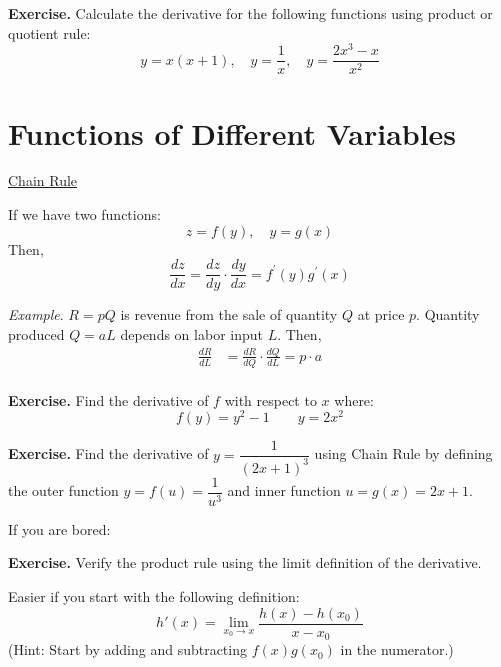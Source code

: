 \documentclass{./../../latex/handout}
\begin{document}
\newpage
\textbf{Exercise.} Calculate the derivative for the following functions using product or quotient rule:
\[ y = x(x+1), \quad y=\frac{1}{x}, \quad y = \frac{2x^3-x}{x^2}\]

\newpage 
\section*{Functions of Different Variables}

\underline{Chain Rule} 

If we have two functions:
\[ z=f(y), \quad y=g(x) \]
Then, 
\[\frac{d z}{d x}=\frac{d z}{d y} \cdot \frac{d y}{d x}=f^{\prime}(y) g^{\prime}(x) \]

\textit{Example}. $R = p Q $ is revenue from the sale of quantity $Q$ at price $p$. Quantity produced $Q= a L$ depends on labor input $L$. Then,
\[
\begin{aligned}
\frac{d R}{d L} &=\frac{d R}{d Q} \cdot \frac{d Q}{d L} = p \cdot a\\
\end{aligned}
\]


\textbf{Exercise.} Find the derivative of $f$ with respect to $x$ where:
\[ f(y) = y^2-1 \quad \quad y = 2x^2  \]

\vspace{3cm}
\textbf{Exercise.} Find the derivative of $y = \dfrac{1}{(2x+1)^3}$ using Chain Rule by defining the outer function $y = f(u) = \dfrac{1}{u^3}$ and inner function $u = g(x) = 2x+1$. 

\newpage

If you are bored:

\textbf{Exercise.} Verify the product rule using the limit definition of the derivative. 

Easier if you start with the following definition:
\[ h'(x)=\lim _{x_0 \rightarrow x}  \frac{h(x)-h(x_0)}{x-x_0} \]
(Hint: Start by adding and subtracting $f(x)g(x_0)$ in the numerator.)
\end{document}
